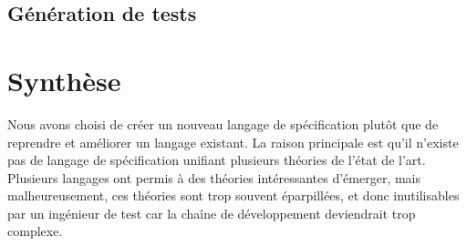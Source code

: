 
\subsection{Génération de tests}

\section{Synthèse}

Nous avons choisi de créer un nouveau langage de spécification plutôt que de
reprendre et améliorer un langage existant.
La raison principale est qu'il n'existe pas de langage de spécification unifiant
plusieurs théories de l'état de l'art. Plusieurs langages ont permis à des
théories intéressantes d'émerger, mais malheureusement, ces théories sont
trop souvent éparpillées, et donc inutilisables par un ingénieur de test car la
chaîne de développement deviendrait trop complexe.


